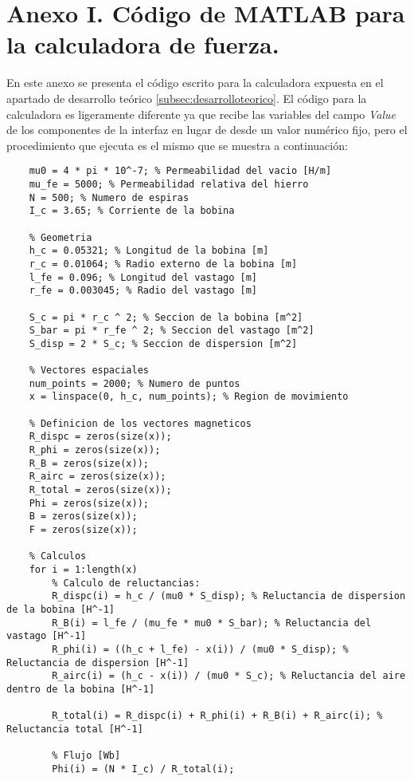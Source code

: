 \section*{Anexo I. Código de MATLAB para la calculadora de fuerza.}
\label{sec:anexo1}
En este anexo se presenta el código escrito para la calculadora expuesta en el apartado de desarrollo teórico \ref{subsec:desarrolloteorico}. El código para la calculadora es ligeramente diferente ya que recibe las variables del campo \textit{Value} de los componentes de la interfaz en lugar de desde un valor numérico fijo, pero el procedimiento que ejecuta es el mismo que se muestra a continuación:

\begin{lstlisting}[style=Matlab-editor]
    % Propiedades electromagneticas
    mu0 = 4 * pi * 10^-7; % Permeabilidad del vacio [H/m]
    mu_fe = 5000; % Permeabilidad relativa del hierro
    N = 500; % Numero de espiras
    I_c = 3.65; % Corriente de la bobina

    % Geometria
    h_c = 0.05321; % Longitud de la bobina [m]
    r_c = 0.01064; % Radio externo de la bobina [m]
    l_fe = 0.096; % Longitud del vastago [m]
    r_fe = 0.003045; % Radio del vastago [m]

    S_c = pi * r_c ^ 2; % Seccion de la bobina [m^2]
    S_bar = pi * r_fe ^ 2; % Seccion del vastago [m^2]
    S_disp = 2 * S_c; % Seccion de dispersion [m^2]

    % Vectores espaciales
    num_points = 2000; % Numero de puntos
    x = linspace(0, h_c, num_points); % Region de movimiento

    % Definicion de los vectores magneticos
    R_dispc = zeros(size(x));
    R_phi = zeros(size(x));
    R_B = zeros(size(x));
    R_airc = zeros(size(x));
    R_total = zeros(size(x));
    Phi = zeros(size(x));
    B = zeros(size(x));
    F = zeros(size(x));

    % Calculos
    for i = 1:length(x)
        % Calculo de reluctancias:
        R_dispc(i) = h_c / (mu0 * S_disp); % Reluctancia de dispersion de la bobina [H^-1]
        R_B(i) = l_fe / (mu_fe * mu0 * S_bar); % Reluctancia del vastago [H^-1]
        R_phi(i) = ((h_c + l_fe) - x(i)) / (mu0 * S_disp); % Reluctancia de dispersion [H^-1]
        R_airc(i) = (h_c - x(i)) / (mu0 * S_c); % Reluctancia del aire dentro de la bobina [H^-1]

        R_total(i) = R_dispc(i) + R_phi(i) + R_B(i) + R_airc(i); % Reluctancia total [H^-1]
        
        % Flujo [Wb]
        Phi(i) = (N * I_c) / R_total(i);
        

\end{lstlisting}
